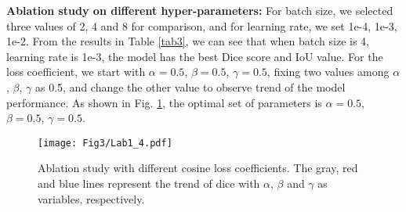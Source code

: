 \documentclass{article}
\begin{document}
\noindent\textbf{Ablation study on different hyper-parameters:} For batch size, we selected three values of 2, 4 and 8 for comparison, and for learning rate, we set 1e-4, 1e-3, 1e-2. From the results in Table \ref{tab3}, we can see that when batch size is 4, learning rate is 1e-3, the model has the best Dice score and IoU value. For the loss coefficient,  we start with $\alpha=0.5$, $\beta=0.5$, $\gamma=0.5$, fixing two values among $\alpha$ , $\beta$, $\gamma$ as 0.5, and change the other value to observe trend of the model performance. As shown in Fig. \ref{Analysiscoef}, the optimal set of parameters is $\alpha=0.5$, $\beta=0.5$, $\gamma=0.5$.
\vspace{-2mm}
\begin{figure}[!ht]
\setlength{\abovecaptionskip}{-10cm}
\setlength{\belowcaptionskip}{-15cm}
\centering %
\texttt{[image: Fig3/Lab1\_4.pdf]}
\caption{Ablation study with different cosine loss coefficients. The gray, red and blue lines represent the trend of dice with $\alpha$, $\beta$ and $\gamma$ as variables, respectively.}
\label{Analysiscoef}
\vspace{-6mm}
\end{figure}
\vspace{-3mm}
\end{document}
